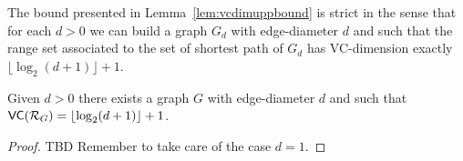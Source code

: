 The bound presented in Lemma~\ref{lem:vcdimuppbound} is strict in the sense that
for each $d>0$ we can build a graph $G_d$ with edge-diameter $d$ and such
that the range set associated to the set of shortest path of $G_d$ has
VC-dimension exactly $\lfloor\log_2(d+1)\rfloor+1$.

\begin{lemma}
  Given $d>0$ there exists a graph $G$ with edge-diameter $d$ and such that
  $\mathsf{VC}(\mathcal{R}_G)=\lfloor\log_2(d+1)\rfloor+1$.
\end{lemma}

\begin{proof}
  \XXX TBD Remember to take care of the case $d=1$.
\end{proof}

